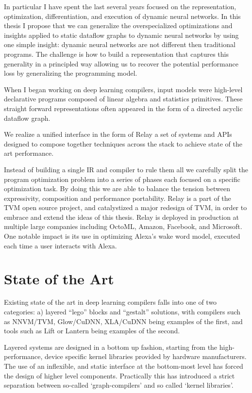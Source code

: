 In particular I have spent the last several years focused on the representation,
optimization, differentiation, and execution of dynamic neural networks.
In this thesis I propose that we can generalize the overspecialized optimizations
and insights applied to static dataflow graphs to dynamic neural networks by using
one simple insight: dynamic neural networks are not different then traditional
programs. The challenge is how to build a representation that captures this generality
in a principled way allowing us to recover the potential performance loss by generalizing
the programming model.

When I began working on deep learning compilers, input models were high-level
declarative programs composed of linear algebra and statistics primitives.
These straight forward representations often appeared in the form of
a directed acyclic dataflow graph.

We realize a unified interface in the form of Relay a set of systems and APIs designed
  to compose together techniques across the stack to achieve state of the art performance.

Instead of building a single IR and compiler to rule them all we carefully split
  the program optimization problem into a series of phases each focused on a specific
  optimization task.
By doing this we are able to balance the tension between expressivity, composition
  and performance portability.
Relay is a part of the TVM open source project, and catalystized a major redesign of
  TVM, in order to embrace and extend the ideas of this thesis.
Relay is deployed in production at multiple large companies including
  OctoML, Amazon, Facebook, and Microsoft.
One notable impact is its use in
  optimizing Alexa’s wake word model, executed each time a user interacts with
  Alexa.

\section{State of the Art}

Existing state of the art in deep learning compilers falls into one of two categories: a) layered “lego” blocks and “gestalt” solutions, with compilers such as NNVM/TVM, Glow/CuDNN, XLA/CuDNN being examples of the first, and tools such as Lift or Lantern being examples of the second.

Layered systems are designed in a bottom up fashion, starting from the high-performance, device specific kernel libraries provided by hardware manufacturers. The use of an inflexible, and static interface at the bottom-most level has forced the design of higher level components. Practically this has introduced a strict separation between so-called ‘graph-compilers’ and so called ‘kernel libraries’.

